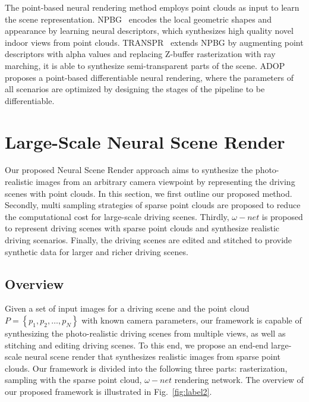 \documentclass[sigconf]{acmart}
\begin{document}
The point-based neural rendering method employs point clouds as input to learn the scene representation. NPBG~\cite{aliev2020neural} encodes the local geometric shapes and appearance by learning neural descriptors, which synthesizes high quality novel indoor views from point clouds. TRANSPR~\cite{kolos2020transpr} extends NPBG by augmenting point descriptors with alpha values and replacing Z-buffer rasterization with ray marching, it is able to synthesize semi-transparent parts of the scene. ADOP~\cite{ruckert2021adop} proposes a point-based differentiable neural rendering, where the parameters of all scenarios are optimized by designing the stages of the pipeline to be differentiable.  



\section{Large-Scale Neural Scene Render}\label{sec:LNSR}
Our proposed Neural Scene Render approach aims to synthesize the photo-realistic images from an arbitrary camera viewpoint by representing the driving scenes with point clouds. In this section, we first outline our proposed method. Secondly, multi sampling strategies of sparse point clouds are proposed to reduce the computational cost for large-scale driving scenes. Thirdly, $\omega-net$ is proposed to represent driving scenes with sparse point clouds and synthesize realistic driving scenarios. Finally, the driving scenes are edited and stitched to provide synthetic data for larger and richer driving scenes.




\subsection{Overview}
Given a set of input images for a driving scene and the point cloud $P=\left\{p_{1}, p_{2}, \ldots, p_{N}\right\}$ with known camera parameters, our framework is capable of synthesizing the photo-realistic driving scenes from multiple views, as well as stitching and editing driving scenes. To this end, we propose an end-end large-scale neural scene render that synthesizes realistic images from sparse point clouds. Our framework is divided into the following three parts: rasterization, sampling with the sparse point cloud, $\omega-net$ rendering network. The overview of our proposed framework is illustrated in Fig.~\ref{fig:label2}.
\end{document}
